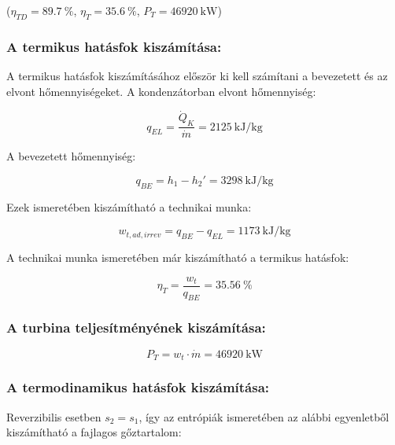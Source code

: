\noindent ($\eta_{TD} = \SI{89.7}{\percent}$, \quad  $\eta_{T} = \SI{35.6}{\percent}$, \quad $P_{T} = \SI{46920}{\kilo\watt}$)

\noindent\hrulefill

\subsubsection{A termikus hatásfok kiszámítása:} 
A termikus hatásfok kiszámításához először ki kell számítani a bevezetett és az elvont hőmennyiségeket.
\noindent A kondenzátorban elvont hőmennyiség:

\begin{equation}
	q_{EL} =\dfrac {\dot{Q}_K}{\dot{m}} = \SI{2125}{\kilo\joule\per\kilogram}
\end{equation}

\noindent A bevezetett hőmennyiség:

\begin{equation}
	q_{BE} = h_1 - h_2'=\SI {3298}{\kilo\joule\per\kilogram}	
\end{equation}

\noindent Ezek ismeretében kiszámítható a technikai munka:

\begin{equation}
	w_{t,ad,irrev} = q_{BE} - q_{EL} =\SI{1173}{\kilo\joule\per\kilogram}
\end{equation}

\noindent A technikai munka ismeretében már kiszámítható a termikus hatásfok:

\begin{equation}
	\eta_{T} = \dfrac {w_t}{q_{BE}} = \SI {35.56}{\percent}
\end{equation}

\subsubsection{A turbina teljesítményének kiszámítása:} 

\begin{equation}
	P_T = w_t \cdot \dot{m} = \SI{46920}{\kilo\watt}
\end{equation}

\subsubsection{A termodinamikus hatásfok kiszámítása:} 
Reverzibilis esetben $s_2=s_1$, így az entrópiák ismeretében az alábbi egyenletből kiszámítható a fajlagos gőztartalom:

